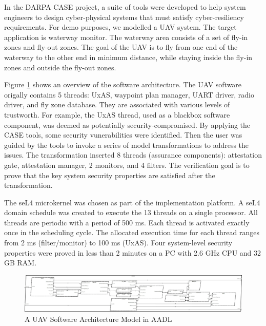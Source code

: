 In the DARPA CASE project, a suite of tools were developed to help system engineers to design cyber-physical systems that must satisfy cyber-resiliency requirements.
For demo purposes, we modelled a UAV system. The target application is waterway monitor. The waterway area consists of a set of fly-in zones and fly-out zones. The goal of the UAV is to fly from one end of the waterway to the other end in minimum distance, while staying inside the fly-in zones and outside the fly-out zones.
 
Figure \ref{SW} shows an overview of the software architecture. The UAV software origally contains 5 threads: UxAS, waypoint plan manager, UART driver, radio driver, and fly zone database. They are associated with various levels of trustworth. For example, the UxAS thread, used as a blackbox software component, was deemed as potentially security-compromised.
By applying the CASE tools, some security vunerabilities were identified. Then the user was guided by the tools to invoke a series of model transformations to address the issues. The transformation inserted 8 threads (assurance components): attestation gate, attestation manager, 2 monitors, and 4 filters. The verification goal is to prove that the key system security properties are satisfied after the transformation.  

The seL4 microkernel was chosen as part of the implementation platform. A seL4 domain schedule was created to execute the 13 threads on a single processor. All threads are periodic with a period of 500 ms. Each thread is activated exactly once in the scheduling cycle. The allocated execution time for each thread ranges from 2 ms (filter/monitor) to 100 ms (UxAS).
Four system-level security properties were proved in less than 2 minutes on a PC with 2.6 GHz CPU and 32 GB RAM.

\begin{figure}[ht!]
\centering
\includegraphics[width=130mm]{sw.jpg}
\caption{A UAV Software Architecture Model in AADL \label{SW}}
\end{figure}
